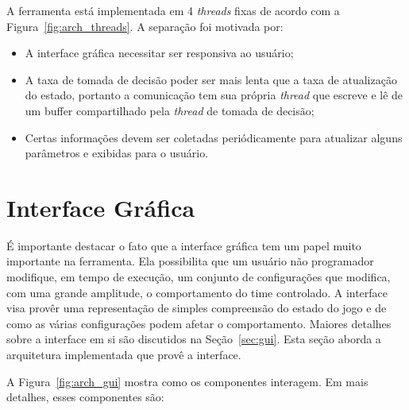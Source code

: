 A ferramenta está implementada em 4 \textit{threads} fixas de acordo com a
Figura~\ref{fig:arch_threads}.  A separação foi motivada por:

\begin{itemize}
  \item A interface gráfica necessitar ser responsiva ao usuário;
  \item A taxa de tomada de decisão poder ser mais lenta que a taxa de
    atualização do estado, portanto a comunicação tem sua própria
    \textit{thread} que escreve e lê de um buffer compartilhado pela
    \textit{thread} de tomada de decisão;
  \item Certas informações devem ser coletadas periódicamente para atualizar
    alguns parâmetros e exibidas para o usuário.
\end{itemize}

\section{Interface Gráfica}

É importante destacar o fato que a interface gráfica tem um papel muito
importante na ferramenta.  Ela possibilita que um usuário não programador
modifique, em tempo de execução, um conjunto de configurações que modifica, com
uma grande amplitude, o comportamento do time controlado.  A interface visa
provêr uma representação de simples compreensão do estado do jogo e de como as
várias configurações podem afetar o comportamento.  Maiores detalhes sobre a
interface em si são discutidos na Seção~\ref{sec:gui}.  Esta seção aborda
a arquitetura implementada que provê a interface.

A Figura~\ref{fig:arch_gui} mostra como os componentes interagem.  Em mais
detalhes, esses componentes são:

